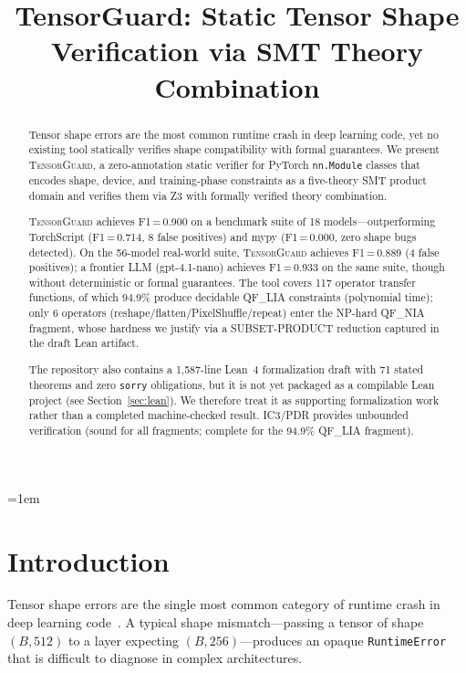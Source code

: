 \documentclass[11pt]{article}
\title{TensorGuard: Static Tensor Shape Verification via SMT Theory Combination}
\date{}
\begin{document}
\emergencystretch=1em

\maketitle

\begin{abstract}
Tensor shape errors are the most common runtime crash in deep learning code,
yet no existing tool statically verifies shape compatibility with formal
guarantees.  We present \textsc{TensorGuard}, a zero-annotation static
verifier for PyTorch \texttt{nn.Module} classes that encodes shape,
device, and training-phase constraints as a five-theory SMT product
domain and verifies them via Z3 with formally verified theory
combination.

\textsc{TensorGuard} achieves F1\,=\,0.900 on a benchmark suite of 18
models---outperforming TorchScript (F1\,=\,0.714, 8 false positives)
and mypy (F1\,=\,0.000, zero shape bugs detected).  On the 56-model
real-world suite, \textsc{TensorGuard} achieves F1\,=\,0.889
(4 false positives); a frontier LLM (gpt-4.1-nano) achieves
F1\,=\,0.933 on the same suite, though without deterministic or
formal guarantees.  The tool covers
117 operator transfer functions, of which 94.9\% produce decidable
QF\_LIA constraints (polynomial time); only 6 operators
(reshape/flatten/PixelShuffle/repeat) enter the NP-hard QF\_NIA
fragment, whose hardness we justify via a SUBSET-PRODUCT reduction
captured in the draft Lean artifact.

The repository also contains a 1,587-line Lean~4 formalization draft
with 71 stated theorems and zero \texttt{sorry} obligations, but it is
not yet packaged as a compilable Lean project (see
Section~\ref{sec:lean}). We therefore treat it as supporting
formalization work rather than a completed machine-checked result.
IC3/PDR provides unbounded verification (sound for all fragments;
complete for the 94.9\% QF\_LIA fragment).
\end{abstract}


\section{Introduction}\label{sec:intro}

Tensor shape errors are the single most common category of runtime crash
in deep learning code~\cite{islam19,zhang18}.  A typical shape mismatch---passing
a tensor of shape $(B, 512)$ to a layer expecting $(B, 256)$---produces an
opaque \texttt{RuntimeError} that is difficult to diagnose in complex
architectures.
\end{document}
